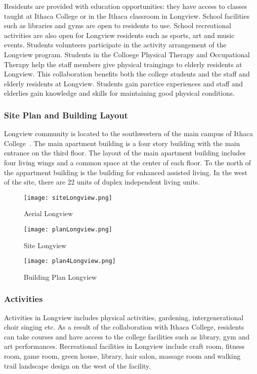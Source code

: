 Residents are provided with education opportunities: they have access
to classes taught at Ithaca College or in the Ithaca classroom in
Longview. School facilities such as libraries and gyms are open to
residents to use. School recreational activities are also open for
Longview residents such as sports, art and music events. Students
volunteers participate in the activity arrangement of the Longview
program. Students in the Colloege Physical Therapy and Occupational
Therapy help the staff members give physical traingings to elderly
residents at Longview. This collaboration benefits both the college
students and the staff and elderly residents at Longview. Students
gain parctice experiences and staff and elderlies gain knowledge and
skills for maintaining good physical conditions.

\subsubsection{Site Plan and Building Layout}
Longview community is located to the southwestern of the main campus
of Ithaca College~\cite{googleMapLongiew}. The main apartment building
is a four story building with the main entrance on the third
floor. The layout of the main apartment building includes four living
wings and a common space at the center of each floor. To the north of
the appartment building is the building for enhanced assisted
living. In the west of the site, there are 22 units of duplex
independent living units.
\begin{figure}[htbp]
  \centering
  \texttt{[image: siteLongview.png]}
  \caption[Aerial View of Longview and Ithaca College]{Aerial Longview~\cite{googleMapLongiew}}
  \label{fig:siteLongview}
\end{figure}

\begin{figure}[htbp]
  \centering
  \texttt{[image: planLongview.png]}
  \caption[Site Plan, Longview]{Site Longview~\cite{patioLongview}}
  \label{fig:planLongview}
\end{figure}

\begin{figure}[htbp]
  \centering
  \texttt{[image: plan4Longview.png]}
  \caption[Building Plan, Longview]{Building Plan
    Longview~\cite{plan4Longview}}
  \label{fig:plan4Longview}
\end{figure}
\subsubsection{Activities}
Activities in Longview includes physical activities, gardening,
intergenerational choir singing etc. As a result of the collaboration
with Ithaca College, residents can take courses and have access to  
the college facilities such as library, gym and art
performances. Recreational facilities in Longview include craft room,
fitness room, game room, green house, library, hair salon, massage
room and walking trail landscape design on the west of the facility.

